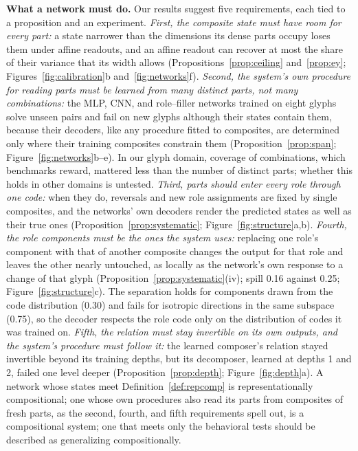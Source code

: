 \documentclass[10pt]{article}
\theoremstyle{plain}
\theoremstyle{remark}
\begin{document}
\textbf{What a network must do.} Our results suggest five requirements, each tied to a proposition and an experiment. \emph{First, the composite state must have room for every part:} a state narrower than the dimensions its dense parts occupy loses them under affine readouts, and an affine readout can recover at most the share of their variance that its width allows (Propositions~\ref{prop:ceiling} and~\ref{prop:ey}; Figures~\ref{fig:calibration}b and~\ref{fig:networks}f). \emph{Second, the system's own procedure for reading parts must be learned from many distinct parts, not many combinations:} the MLP, CNN, and role--filler networks trained on eight glyphs solve unseen pairs and fail on new glyphs although their states contain them, because their decoders, like any procedure fitted to composites, are determined only where their training composites constrain them (Proposition~\ref{prop:span}; Figure~\ref{fig:networks}b--e). In our glyph domain, coverage of combinations, which benchmarks reward, mattered less than the number of distinct parts; whether this holds in other domains is untested. \emph{Third, parts should enter every role through one code:} when they do, reversals and new role assignments are fixed by single composites, and the networks' own decoders render the predicted states as well as their true ones (Proposition~\ref{prop:systematic}; Figure~\ref{fig:structure}a,b). \emph{Fourth, the role components must be the ones the system uses:} replacing one role's component with that of another composite changes the output for that role and leaves the other nearly untouched, as locally as the network's own response to a change of that glyph (Proposition~\ref{prop:systematic}(iv); spill 0.16 against 0.25; Figure~\ref{fig:structure}c). The separation holds for components drawn from the code distribution (0.30) and fails for isotropic directions in the same subspace (0.75), so the decoder respects the role code only on the distribution of codes it was trained on. \emph{Fifth, the relation must stay invertible on its own outputs, and the system's procedure must follow it:} the learned composer's relation stayed invertible beyond its training depths, but its decomposer, learned at depths 1 and 2, failed one level deeper (Proposition~\ref{prop:depth}; Figure~\ref{fig:depth}a). A network whose states meet Definition~\ref{def:repcomp} is representationally compositional; one whose own procedures also read its parts from composites of fresh parts, as the second, fourth, and fifth requirements spell out, is a compositional system; one that meets only the behavioral tests should be described as generalizing compositionally.
\end{document}
